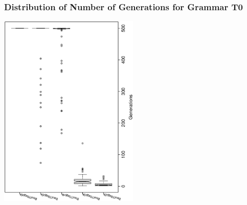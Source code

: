  \begin{frame}
 \frametitle{ Distribution of Number of Generations for Grammar T0 }
 \begin{center}
\includegraphics[width=0.5\textwidth, angle=-90]
{ExpBboxplottGenerations005.eps}
 \end{center}
 \label{ExpBboxplottGenerations005.eps}  
 \end{frame}

